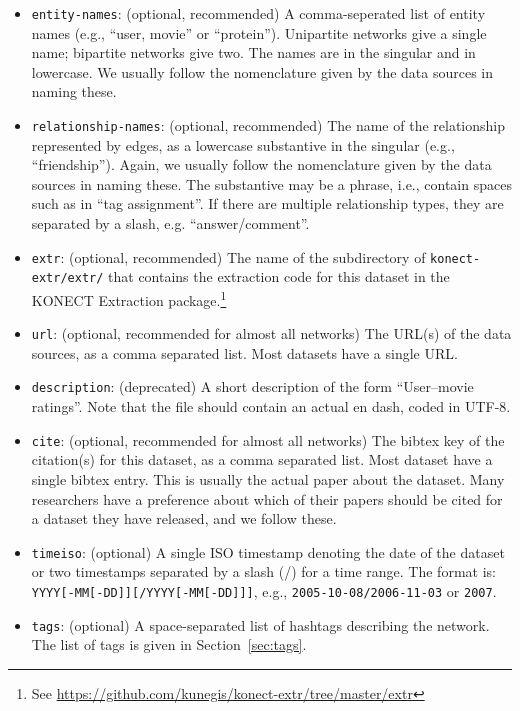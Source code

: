 \documentclass{article}
\begin{document}
\begin{itemize}
\item \texttt{entity-names}: (optional, recommended) A comma-seperated list of
  entity names (e.g., ``user, movie'' or ``protein'').  Unipartite networks give
  a single name; bipartite networks give two.
  The names are in the singular and in lowercase. 
  We usually follow the nomenclature given by the data sources in naming
  these. 
\item \texttt{relationship-names}: (optional, recommended) The name of the
  relationship represented by edges, as a lowercase substantive in the singular (e.g.,
  ``friendship'').
  Again, we usually follow the nomenclature given by the data sources in naming
  these.  The substantive may be a phrase, i.e., contain spaces such as
  in ``tag assignment''.  If there are multiple relationship types, they
  are separated by a slash, e.g. ``answer/comment''.
\item \texttt{extr}: (optional, recommended) The name of the
  subdirectory of \texttt{konect-extr/extr/} that
  contains the extraction code for this dataset in the KONECT
  Extraction package.\footnote{See
    \href{https://github.com/kunegis/konect-extr/tree/master/extr}{https://github.com/kunegis/konect-extr/tree/master/extr}} 
\item \texttt{url}: (optional, recommended for almost all networks) The
  URL(s) of the data sources, as a comma 
  separated list.  Most datasets have a single URL.
\item \texttt{description}: (deprecated) A short description of the form
  ``User–movie ratings''.  Note that the file should contain an
  actual en dash, coded in UTF-8.
\item \texttt{cite}: (optional, recommended for almost all networks) The
  bibtex key of the citation(s) for this dataset, as a  
  comma separated list. Most dataset have a single bibtex entry.  This
  is usually the actual paper about the dataset.  Many researchers have
  a preference about which of their papers should be cited for a dataset
  they have released, and we follow these. 
\item \texttt{timeiso}: (optional) A single ISO timestamp denoting
  the date of the dataset or two timestamps separated by a
  slash (/) for a time range. The format is:
  \texttt{YYYY[-MM[-DD]][/YYYY[-MM[-DD]]]}, e.g., \texttt{2005-10-08/2006-11-03}
  or \texttt{2007}.
\item \texttt{tags}: (optional) A space-separated list of hashtags
  describing the network.  The list of tags is given in
  Section~\ref{sec:tags}.  

\end{itemize}
\end{document}
